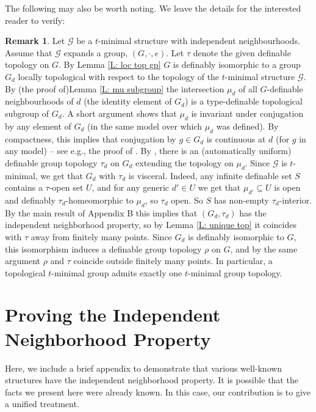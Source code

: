 \documentclass{amsart}
\theoremstyle{definition}
\newtheorem{remark}[theorem]{Remark}
\begin{document}
The following may also be worth noting. We leave the details for the interested reader to verify: 
\begin{remark}
    Let $\mathcal G$ be a $t$-minimal structure with independent neighbourhoods. Assume that $\mathcal G$ expands a group, $(G, \cdot, e)$. Let $\tau$ denote the given definable topology on $G$. By  Lemma \ref{L: loc top gp} $G$ is definably isomorphic to a group $G_d$ locally topological with respect to the topology of the $t$-minimal structure $\mathcal G$. By (the proof of)Lemma \ref{L: mu subgroup} the intersection $\mu_d$ of all $G$-definable neighbourhoods of $d$ (the identity element of $G_d$) is a type-definable topological subgroup of $G_d$. A short argument shows that $\mu_d$ is invariant under conjugation by any element of $G_d$ (in the same model over which $\mu_d$ was defined). By compactness, this implies that conjugation by $g\in G_d$ is continuous at $d$ (for $g$ in any model) -- see e.g., the proof of \cite[Proposition 5.17(3)]{HaHaPeGps}. By \cite[Lemma 2.11]{HaHaPeGps}, there is an (automatically uniform) definable group topology $\tau_d$ on $G_d$ extending the topology on $\mu_d$. Since $\mathcal G$ is $t$-minimal, we get that $G_d$ with $\tau_d$ is visceral. Indeed, any infinite definable set $S$ contains a $\tau$-open set $U$, and for any generic $d'\in U$ we get that $\mu_{d'}\subseteq U$ is open and definably  $\tau_d$-homeomorphic to $\mu_d$, so $\tau_d$ open. So $S$ has non-empty $\tau_d$-interior. By the main result of Appendix B this implies that $(G_d, \tau_d)$ has the independent neighborhood property, so by Lemma \ref{L: unique top} it coincides with $\tau$ away from finitely many points. Since $G_d$ is definably isomorphic to $G$, this isomorphism induces a definable group topology $\rho$ on $G$, and by the same argument  $\rho$ and $\tau$ coincide outside finitely many points. In particular, a topological $t$-minimal group admits exactly one $t$-minimal group topology. 
    \end{remark}
 
\appendix

\section{Proving the Independent Neighborhood Property}

Here, we include a brief appendix to demonstrate that various well-known structures have the independent neighborhood property. It is possible that the facts we present here were already known. In this case, our contribution is to give a unified treatment.
\end{document}
